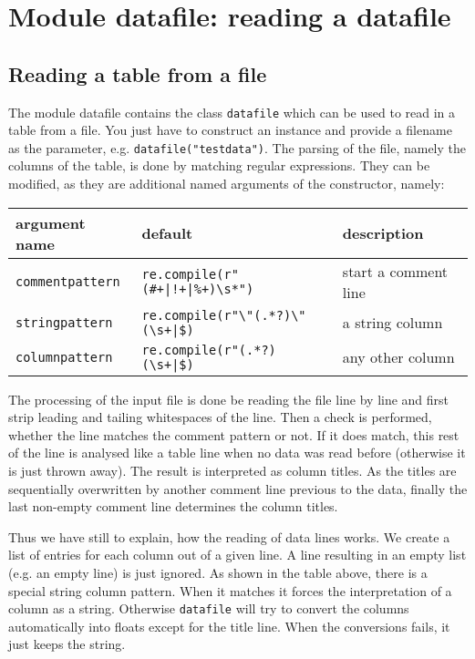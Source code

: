 \chapter{Module datafile: reading a datafile}
\label{datafile}

\section{Reading a table from a file}

The module datafile contains the class \verb|datafile| which can be
used to read in a table from a file. You just have to construct an
instance and provide a filename as the parameter, e.g.
\verb|datafile("testdata")|. The parsing of the file, namely the
columns of the table, is done by matching regular expressions. They
can be modified, as they are additional named arguments of the
constructor, namely:

\medskip
\begin{tabularx}{\linewidth}{ll>{\raggedright\arraybackslash}X}
argument name&default&description\\
\hline
\texttt{commentpattern}&\texttt{re.compile(r"(\#+|!+|\%+)\textbackslash s*")}&start a comment line\\
\texttt{stringpattern}&\texttt{re.compile(r"\textbackslash"(.*?)\textbackslash"(\textbackslash s+|\$)}&a string column\\
\texttt{columnpattern}&\texttt{re.compile(r"(.*?)(\textbackslash s+|\$)}&any other column\\
\end{tabularx}
\medskip

The processing of the input file is done be reading the file line by
line and first strip leading and tailing whitespaces of the line. Then
a check is performed, whether the line matches the comment pattern or
not. If it does match, this rest of the line is analysed like a table
line when no data was read before (otherwise it is just thrown away).
The result is interpreted as column titles. As the titles are
sequentially overwritten by another comment line previous to the data,
finally the last non-empty comment line determines the column titles.

Thus we have still to explain, how the reading of data lines works. We
create a list of entries for each column out of a given line. A line
resulting in an empty list (e.g. an empty line) is just ignored. As
shown in the table above, there is a special string column pattern.
When it matches it forces the interpretation of a column as a string.
Otherwise \verb|datafile| will try to convert the columns
automatically into floats except for the title line. When the
conversions fails, it just keeps the string.

